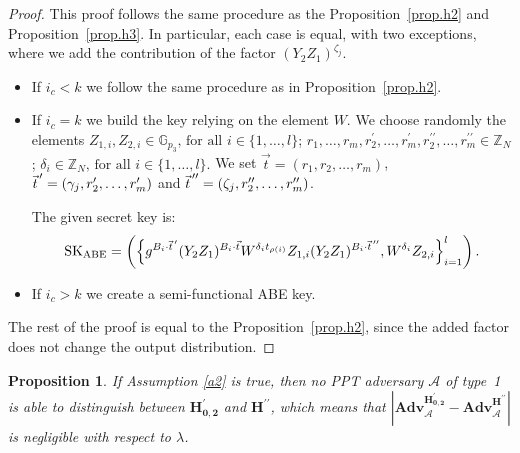 \documentclass[a4paper,10pt]{article}
\newtheorem{proposition}{Proposition}
\newcommand{\G}{\mathbb{G}}
\newcommand{\Z}{\mathbb{Z}}
\newcommand{\adv}{\textbf{Adv}}
\newcommand{\varRow}{l}
\newcommand{\varColumn}{m}
\newcommand{\pvec}[2][]{{\hspace{-0.05em}\vec{\hspace{0.05em}#2}\mkern2mu\vphantom{#2}}^\prime_{\hspace{-0.18em}#1}}
\newcommand{\ppvec}[2][]{{\hspace{-0.05em}\vec{\hspace{0.05em}#2}\mkern2mu\vphantom{#2}}^{\prime\prime}_{\hspace{-0.18em}#1}}
\newcommand{\randomchoose}[1]{We choose randomly the element\ifstrequal{#1}{s}{}{s} }
\newcommand{\game}[2]{$\mathbf{#1_{#2}}$}
\newcommand{\mathgame}[2]{\mathbf{#1_{#2}}}
\newcommand{\typeone}{type~1}
\begin{document}
	\begin{proof}
		This proof follows the same procedure as the Proposition~\ref{prop.h2} and Proposition~\ref{prop.h3}.
		In particular, each case is equal, with two exceptions, where we add the contribution of the factor $(Y_2Z_1)^{\zeta_j}$.
		\begin{itemize}
			\item
			If $i_c<k$ we follow the same procedure as in Proposition~\ref{prop.h2}.
			\item
			If $i_c=k$ we build the key relying on the element $W$.
			\randomchoose{p}{$Z_{1,i},Z_{2,i}\in\G_{p_3}\text{, for all }i\in \{1,\ldots,\varRow\}$;
				$r_{1},\ldots,r_{\varColumn},r^\prime_{2},\ldots,\allowbreak{}r^\prime_{\varColumn},r^{\prime\prime}_{2},\ldots,r^{\prime\prime}_{\varColumn}\in \Z_N$;
				$\delta_i\in\Z_N\text{, for all }i\in \{1,\ldots,\varRow\}$.
			}
			We set $\vec{t}=(r_1,r_{2},\ldots,\allowbreak{}r_{\varColumn})$, $\pvec{t}=(\gamma_j,r^\prime_{2},\ldots,r^\prime_{\varColumn})$ and $\ppvec{t}=(\zeta_j,r^{\prime\prime}_{2},\ldots,r^{\prime\prime}_{\varColumn})$.
			
			The given secret key is:
			\[
				\mathrm{SK}_\textnormal{ABE}=\left( \left\{ g^{B_i\cdot \pvec{t}} (Y_2 Z_1)^{B_i\cdot\vec{t}}W^{\delta_i t_{\rho(i)}} Z_{1,i}(Y_2Z_1)^{B_i\cdot\ppvec{t}}, W^{\delta_i}Z_{2,i} \right\}_{i=1}^{\varRow} \right).
			\]
			\item
			If $i_c>k$ we create a semi-functional ABE key.
		\end{itemize}
		The rest of the proof is equal to the Proposition~\ref{prop.h2}, since the added factor does not change the output distribution.
	\end{proof}
	\begin{proposition}
		\label{prop.h5}
		If Assumption \ref{a2} is true, then no PPT adversary $\mathcal{A}$ of \typeone{} is able to distinguish between \game{H^\prime}{0,2} and \game{H^{\prime\prime}}{}, which means that $\left| \adv_{\mathcal{A}}^{\mathgame{H^\prime}{0,2}} - \adv_{\mathcal{A}}^{\mathgame{H^{\prime\prime}}{}}\right|$ is negligible with respect to $\lambda$.
	\end{proposition}
\end{document}
